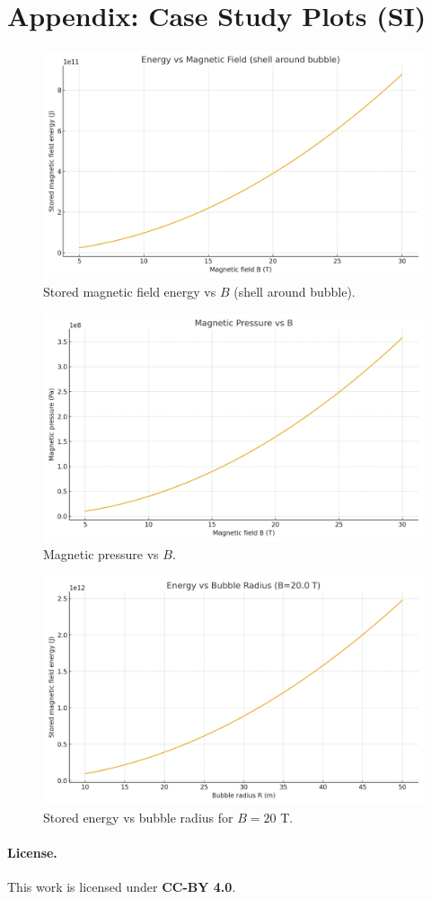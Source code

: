 \documentclass[11pt]{article}
\begin{document}
\section*{Appendix: Case Study Plots (SI)}
\begin{figure}[h]\centering\includegraphics[width=0.8\linewidth]{figures/case_study/energy_vs_B.png}\caption{Stored magnetic field energy vs $B$ (shell around bubble).}\end{figure}
\begin{figure}[h]\centering\includegraphics[width=0.8\linewidth]{figures/case_study/pressure_vs_B.png}\caption{Magnetic pressure vs $B$.}\end{figure}
\begin{figure}[h]\centering\includegraphics[width=0.8\linewidth]{figures/case_study/energy_vs_R.png}\caption{Stored energy vs bubble radius for $B=20$ T.}\end{figure}

\paragraph{License.} This work is licensed under \textbf{CC-BY 4.0}.

\printbibliography
\end{document}
